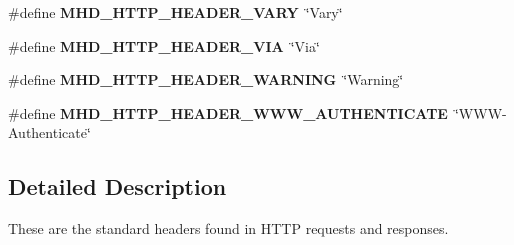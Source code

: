 \begin{DoxyCompactItemize}
\item 
\hypertarget{group__headers_gadf80ab6130b50684335800e0e87439d5}{\#define {\bfseries \-M\-H\-D\-\_\-\-H\-T\-T\-P\-\_\-\-H\-E\-A\-D\-E\-R\-\_\-\-V\-A\-R\-Y}~\char`\"{}\-Vary\char`\"{}}\label{group__headers_gadf80ab6130b50684335800e0e87439d5}

\item 
\hypertarget{group__headers_gabc1b03d1f8cdbef998286b30dbf02880}{\#define {\bfseries \-M\-H\-D\-\_\-\-H\-T\-T\-P\-\_\-\-H\-E\-A\-D\-E\-R\-\_\-\-V\-I\-A}~\char`\"{}\-Via\char`\"{}}\label{group__headers_gabc1b03d1f8cdbef998286b30dbf02880}

\item 
\hypertarget{group__headers_ga13d76791342662011683997744b3b6de}{\#define {\bfseries \-M\-H\-D\-\_\-\-H\-T\-T\-P\-\_\-\-H\-E\-A\-D\-E\-R\-\_\-\-W\-A\-R\-N\-I\-N\-G}~\char`\"{}\-Warning\char`\"{}}\label{group__headers_ga13d76791342662011683997744b3b6de}

\item 
\hypertarget{group__headers_gad2f35dc8bf2ad4a675c9104e6cd97d55}{\#define {\bfseries \-M\-H\-D\-\_\-\-H\-T\-T\-P\-\_\-\-H\-E\-A\-D\-E\-R\-\_\-\-W\-W\-W\-\_\-\-A\-U\-T\-H\-E\-N\-T\-I\-C\-A\-T\-E}~\char`\"{}\-W\-W\-W-\/\-Authenticate\char`\"{}}\label{group__headers_gad2f35dc8bf2ad4a675c9104e6cd97d55}

\end{DoxyCompactItemize}


\subsection{\-Detailed \-Description}
\-These are the standard headers found in \-H\-T\-T\-P requests and responses. 